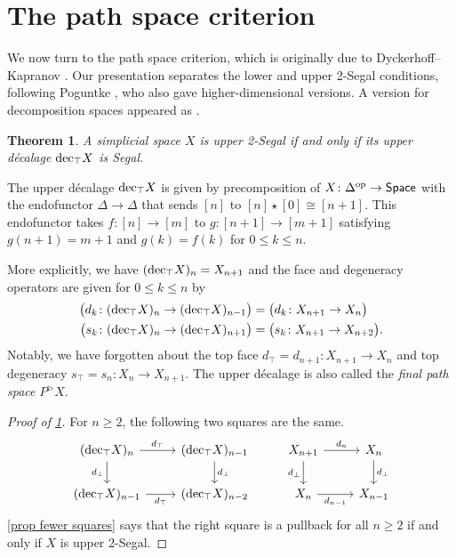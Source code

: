 \documentclass{amsart}
\newtheorem{theorem}{Theorem}[section]
\theoremstyle{definition}
\theoremstyle{remark}
\newcommand{\spaces}{\mathsf{Space}}
\newcommand{\op}{\textup{op}}
\newcommand{\udec}{\textup{dec}_{\top}}
\begin{document}
\section{The path space criterion}\label{sec path space}

We now turn to the path space criterion, which is originally due to Dyckerhoff--Kapranov \cite[Theorem 6.3.2]{DyckerhoffKapranov:HSS}.
Our presentation separates the lower and upper 2-Segal conditions, following Poguntke \cite{Poguntke:HSSAKT}, who also gave higher-dimensional versions.
A version for decomposition spaces appeared as \cite[Theorem 4.10]{GKT1}.

\begin{theorem}\label{thm upper path}
A simplicial space $X$ is upper 2-Segal if and only if its upper d\'ecalage $\udec X$ is Segal.
\end{theorem}

The upper d\'ecalage $\udec X$ is given by precomposition of $X \colon \Delta^\op \to \spaces$ with the endofunctor $\Delta \to \Delta$ that sends $[n]$ to $[n]\star [0] \cong [n+1]$.
This endofunctor takes $f\colon [n] \to [m]$ to $g\colon [n+1] \to [m+1]$ satisfying $g(n+1) = m+1$ and $g(k) = f(k)$ for $0\leq k \leq n$.

More explicitly, we have $(\udec X)_n = X_{n+1}$ and the face and degeneracy operators are given for $0 \leq k \leq n$ by
\begin{align*} 
\big( d_k \colon (\udec X)_n \to (\udec X)_{n-1} \big) &= \big( d_k \colon X_{n+1} \to X_n \big)
\\
\big( s_k \colon (\udec X)_n \to (\udec X)_{n+1} \big) &= \big( s_k \colon X_{n+1} \to X_{n+2} \big).
\end{align*}
Notably, we have forgotten about the top face $d_\top = d_{n+1} \colon X_{n+1} \to X_n$ and top degeneracy $s_\top = s_n \colon X_n \to X_{n+1}$.
The upper d\'ecalage is also called the \emph{final path space} $P^\triangleright X$.

\begin{proof}[Proof of \cref{thm upper path}]
For $n\geq 2$, the following two squares are the same.
\[ \begin{tikzcd}
(\udec X)_n \rar{d_\top} \dar[swap]{d_\bot}  & (\udec X)_{n-1} \dar{d_\bot} 
&  
X_{n+1} \rar{d_n} \dar[swap]{d_\bot}  & X_n \dar{d_\bot}
\\
(\udec X)_{n-1} \rar[swap]{d_\top} & (\udec X)_{n-2}
&  
X_n \rar[swap]{d_{n-1}} & X_{n-1}
\end{tikzcd} \]
\cref{prop fewer squares} says that the right square is a pullback for all $n\geq 2$ if and only if $X$ is upper 2-Segal.
\end{proof}
\end{document}
